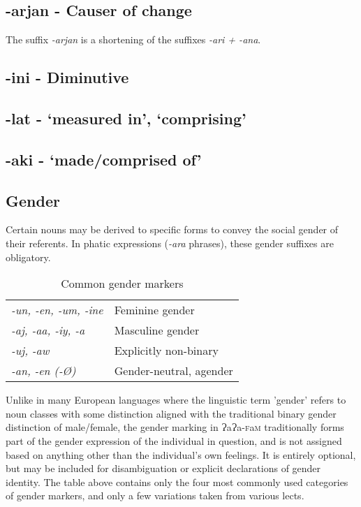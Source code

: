 \documentclass[a4paper,10pt,twoside,openright]{memoir}
\newcommand{\lang}{{\bigglot}a{\bigglot}a-\textsc{f}a\textsc{m}}
\newcommand{\bigglot}{Ɂ}
\begin{document}
\subsection{-arjan - Causer of change}

The suffix \textit{-arjan} is a shortening of the suffixes \textit{-ari + -ana}. 

\subsection{-ini - Diminutive}

\subsection{-lat - `measured in', `comprising'}

\subsection{-aki - `made/comprised of'}

\subsection{Gender}
Certain nouns may be derived to specific forms to convey the social gender of their referents. In phatic expressions (\emph{-ara} phrases), these gender suffixes are obligatory.

\begin{table}[ht]
    \centering
    \begin{tabular}{>{\em}ll}
    -un, -en, -um, -ine & Feminine gender \\
    -aj, -aa, -iy, -a & Masculine gender \\
    -uj, -aw & Explicitly non-binary \\
    -an, -en (-Ø) & Gender-neutral, agender \\
    \end{tabular}
    \caption{Common gender markers}
\end{table}

Unlike in many European languages where the linguistic term 'gender' refers to noun classes with some distinction aligned with the traditional binary gender distinction of male/female, the gender marking in \lang{} traditionally forms part of the gender expression of the individual in question, and is not assigned based on anything other than the individual's own feelings. It is entirely optional, but may be included for disambiguation or explicit declarations of gender identity. The table above contains only the four most commonly used categories of gender markers, and only a few variations taken from various lects.
\end{document}
